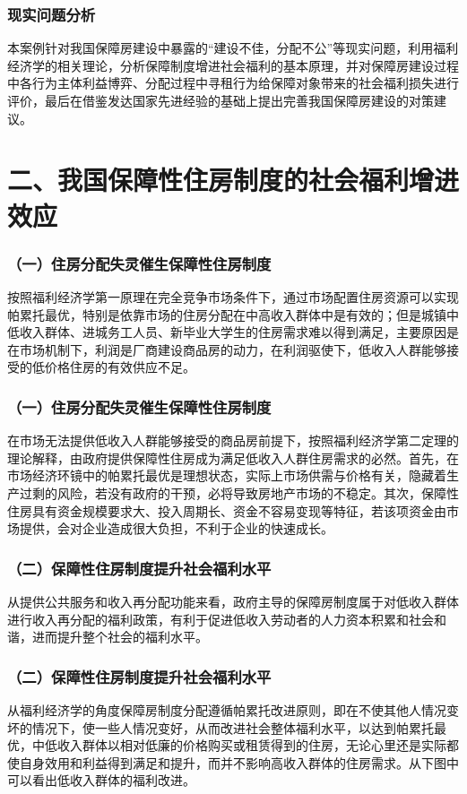\documentclass[aspectratio=169, 12pt]{beamer}
\begin{document}
\begin{frame}[plain]
    \frametitle{现实问题分析}
    本案例针对我国保障房建设中暴露的“建设不佳，分配不公”等现实问题，利用福利经济学的相关理论，分析保障制度增进社会福利的基本原理，并对保障房建设过程中各行为主体利益博弈、分配过程中寻租行为给保障对象带来的社会福利损失进行评价，最后在借鉴发达国家先进经验的基础上提出完善我国保障房建设的对策建议。
\end{frame}

\section{二、我国保障性住房制度的社会福利增进效应}

\begin{frame}[plain]
    \frametitle{（一）住房分配失灵催生保障性住房制度}
    按照福利经济学第一原理在完全竞争市场条件下，通过市场配置住房资源可以实现帕累托最优，特别是依靠市场的住房分配在中高收入群体中是有效的；但是城镇中低收入群体、进城务工人员、新毕业大学生的住房需求难以得到满足，主要原因是在市场机制下，利润是厂商建设商品房的动力，在利润驱使下，低收入人群能够接受的低价格住房的有效供应不足。
\end{frame}

\begin{frame}[plain]
    \frametitle{（一）住房分配失灵催生保障性住房制度}
    在市场无法提供低收入人群能够接受的商品房前提下，按照福利经济学第二定理的理论解释，由政府提供保障性住房成为满足低收入人群住房需求的必然。首先，在市场经济环镜中的帕累托最优是理想状态，实际上市场供需与价格有关，隐藏着生产过剩的风险，若没有政府的干预，必将导致房地产市场的不稳定。其次，保障性住房具有资金规模要求大、投入周期长、资金不容易变现等特征，若该项资金由市场提供，会对企业造成很大负担，不利于企业的快速成长。
\end{frame}

\begin{frame}[plain]
    \frametitle{（二）保障性住房制度提升社会福利水平}
    从提供公共服务和收入再分配功能来看，政府主导的保障房制度属于对低收入群体进行收入再分配的福利政策，有利于促进低收入劳动者的人力资本积累和社会和谐，进而提升整个社会的福利水平。
\end{frame}

\begin{frame}[plain]
    \frametitle{（二）保障性住房制度提升社会福利水平}
    从福利经济学的角度保障房制度分配遵循帕累托改进原则，即在不使其他人情况变坏的情况下，使一些人情况变好，从而改进社会整体福利水平，以达到帕累托最优，中低收入群体以相对低廉的价格购买或租赁得到的住房，无论心里还是实际都使自身效用和利益得到满足和提升，而并不影响高收入群体的住房需求。从下图中可以看出低收入群体的福利改进。
\end{frame}
\end{document}
